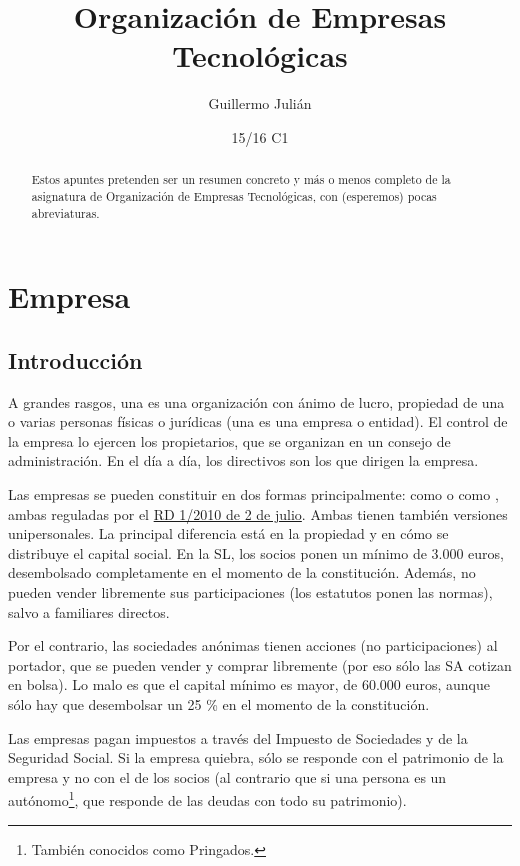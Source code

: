 \documentclass[nochap,palatino,notitlepage]{apuntes}
\title{Organización de Empresas Tecnológicas}
\author{Guillermo Julián}
\date{15/16 C1}
\begin{document}
\pagestyle{plain}
\maketitle

\begin{abstract}
Estos apuntes pretenden ser un resumen concreto y más o menos completo de la asignatura de Organización de Empresas Tecnológicas, con (esperemos) pocas abreviaturas.
\end{abstract}

\tableofcontents
\newpage
\section{Empresa}

\subsection{Introducción}

A grandes rasgos, una  es una organización con ánimo de lucro, propiedad de una o varias personas físicas o jurídicas (una  es una empresa o entidad). El control de la empresa lo ejercen los propietarios, que se organizan en un consejo de administración. En el día a día, los directivos son los que dirigen la empresa.

Las empresas se pueden constituir en dos formas principalmente: como  o como , ambas reguladas por el \href{https://www.boe.es/buscar/act.php?id=BOE-A-2010-10544}{RD 1/2010 de 2 de julio}. Ambas tienen también versiones unipersonales. La principal diferencia está en la propiedad y en cómo se distribuye el capital social. En la SL, los socios ponen un mínimo de 3.000 euros, desembolsado completamente en el momento de la constitución. Además, no pueden vender libremente sus participaciones (los estatutos ponen las normas), salvo a familiares directos.

Por el contrario, las sociedades anónimas tienen acciones (no participaciones) al portador, que se pueden vender y comprar libremente (por eso sólo las SA cotizan en bolsa). Lo malo es que el capital mínimo es mayor, de 60.000 euros, aunque sólo hay que desembolsar un 25 \% en el momento de la constitución.

Las empresas pagan impuestos a través del Impuesto de Sociedades y de la Seguridad Social. Si la empresa quiebra, sólo se responde con el patrimonio de la empresa y no con el de los socios (al contrario que si una persona es un autónomo\footnote{También conocidos como Pringados\texttrademark.}, que responde de las deudas con todo su patrimonio).
\end{document}

